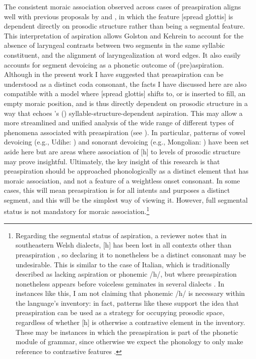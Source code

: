 \documentclass[output=paper,colorlinks,citecolor=brown]{langscibook}
\begin{document}
\begin{sloppypar}
The consistent moraic association observed across cases of preaspiration aligns well with previous proposals by \citet{kehreingolston2004} and \citet{golstonkehrein2013}, in which the feature [spread glottis] is dependent directly on prosodic structure rather than being a segmental feature. This interpretation of aspiration allows Golston and Kehrein to account for the absence of laryngeal contrasts between two segments in the same syllabic constituent, and the alignment of laryngealization at word edges. It also easily accounts for segment devoicing as a phonetic outcome of (pre)aspiration. Although in the present work I have suggested that preaspiration can be understood as a distinct coda consonant, the facts I have discussed here are also compatible with a model where [spread glottis] shifts to, or is inserted to fill, an empty moraic position, and is thus directly dependent on prosodic structure in a way that echoes {\citeauthor{kehreingolston2004}'s (\citeyear{kehreingolston2004})} syllable-structure-dependent aspiration. This may allow a more streamlined and unified analysis of the wide range of different types of phenomena associated with preaspiration (see ). In particular, patterns of vowel devoicing (e.g., Udihe: \citealp{kuznetsova2022}) and sonorant devoicing (e.g., Mongolian: \citealp{svantessonkarlsson2012}) have been set aside here but are areas where association of [h] to levels of prosodic structure may prove insightful.
Ultimately, the key insight of this research is that preaspiration should be approached phonologically as a distinct element that has moraic association, and not a feature of a weightless onset consonant. In some cases, this will mean preaspiration is for all intents and purposes a distinct segment, and this will be the simplest way of viewing it. However, full segmental status is not mandatory for moraic association.\footnote{Regarding the segmental status of aspiration, a reviewer notes that in southeastern Welsh dialects, [h] has been lost in all contexts other than preaspiration \citep{iosad2023}, so declaring it to nonetheless be a distinct consonant may be undesirable. This is similar to the case of Italian, which is traditionally described as lacking aspiration or phonemic /h/, but where preaspiration nonetheless appears before voiceless geminates in several dialects \citep{stevenshajek2004,stevenshajek2007,kramer2009,stevens2011}. In instances like this, I am not claiming that phonemic /h/ is necessary within the language's inventory: in fact, patterns like these support the idea that preaspiration can be used as a strategy for occupying prosodic space, regardless of whether [h] is otherwise a contrastive element in the inventory. These may be instances in which the preaspiration is part of the phonetic module of grammar, since otherwise we expect the phonology to only make reference to contrastive features \citep{dresher2009}.}
\end{sloppypar}
\end{document}

